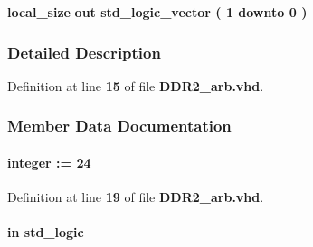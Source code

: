 \begin{DoxyCompactItemize}
\item 
{\bf local\+\_\+size}  {\bfseries {\bfseries \textcolor{keywordflow}{out}\textcolor{vhdlchar}{ }}} {\bfseries \textcolor{comment}{std\+\_\+logic\+\_\+vector}\textcolor{vhdlchar}{ }\textcolor{vhdlchar}{(}\textcolor{vhdlchar}{ }\textcolor{vhdlchar}{ } \textcolor{vhdldigit}{1} \textcolor{vhdlchar}{ }\textcolor{keywordflow}{downto}\textcolor{vhdlchar}{ }\textcolor{vhdlchar}{ } \textcolor{vhdldigit}{0} \textcolor{vhdlchar}{ }\textcolor{vhdlchar}{)}\textcolor{vhdlchar}{ }} 
\end{DoxyCompactItemize}


\subsubsection{Detailed Description}


Definition at line {\bf 15} of file {\bf D\+D\+R2\+\_\+arb.\+vhd}.



\subsubsection{Member Data Documentation}
\paragraph[{addr\+\_\+size}]{ {\bfseries \textcolor{vhdlchar}{ }} {\bfseries \textcolor{comment}{integer}\textcolor{vhdlchar}{ }\textcolor{vhdlchar}{ }\textcolor{vhdlchar}{\+:}\textcolor{vhdlchar}{=}\textcolor{vhdlchar}{ }\textcolor{vhdlchar}{ } \textcolor{vhdldigit}{24} \textcolor{vhdlchar}{ }} \hspace{0.3cm}{\ttfamily [Generic]}}\label{classDDR2__arb_aafb0d946e5259c516e95eed0224fc8e6}


Definition at line {\bf 19} of file {\bf D\+D\+R2\+\_\+arb.\+vhd}.

\paragraph[{clk}]{ {\bfseries \textcolor{keywordflow}{in}\textcolor{vhdlchar}{ }} {\bfseries \textcolor{comment}{std\+\_\+logic}\textcolor{vhdlchar}{ }} \hspace{0.3cm}{\ttfamily [Port]}}\label{classDDR2__arb_a4a4609c199d30b3adebbeb3a01276ec5}


